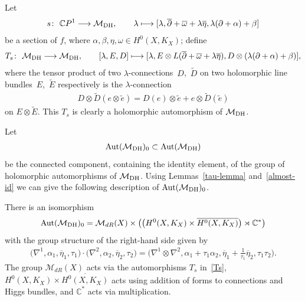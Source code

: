 Let \begin{gather*}s \colon \ {\mathbb C}P^1 \longrightarrow {\mathcal M}_{\rm DH} ,\qquad
\lambda \longmapsto [\lambda, \overline{\partial} +\overline{\omega}+ \lambda\overline{\eta}, \lambda(\partial+\alpha)+\beta]
\end{gather*}
be a section of $f$, where $\alpha, \beta, \eta, \omega \in H^0(X, K_X)$; def\/ine
\begin{gather}\label{Ts}
T_s \colon \ {\mathcal M}_{\rm DH} \longrightarrow {\mathcal M}_{\rm DH} ,\qquad [\lambda, E, D] \longmapsto [\lambda, E\otimes
L(\overline{\partial}+\overline{\omega}+\lambda\overline{\eta}), D\otimes(\lambda(\partial+\alpha)+\beta)] ,
\end{gather}
where the tensor product of two $\lambda$-connections~$D$,~$\widetilde{D}$ on two holomorphic line bundles~$E$,~$\widetilde E$ respectively is the
$\lambda$-connection
\begin{gather*}D\otimes\widetilde{D}(e\otimes\widetilde{e}) = D(e)\otimes \widetilde{e}+e\otimes \widetilde{D}(\widetilde {e})\end{gather*}
on $E\otimes\widetilde{E}$. This $T_s$ is clearly a holomorphic automorphism of ${\mathcal M}_{\rm DH}$.

Let
\begin{gather*}
\operatorname{Aut}({\mathcal M}_{\rm DH})_0 \subset \operatorname{Aut}({\mathcal M}_{\rm DH})
\end{gather*}
be the connected component, containing the identity element, of the group of holomorphic automorphisms of ${\mathcal M}_{\rm DH}$. Using Lemmas~\ref{tau-lemma} and~\ref{almost-id} we can give the following description of $\operatorname{Aut}({\mathcal M}_{\rm DH})_0$.

\begin{Theorem}\label{thmDHa}
There is an isomorphism
\begin{gather*}\operatorname{Aut}({\mathcal M}_{\rm DH})_0 =
\mathcal M_{dR}(X)\times \big(\big(H^0(X, K_X)\times\overline{H^0(X, K_X)}\big)\rtimes {\mathbb C}^*\big)\end{gather*}
with the group structure of the right-hand side given by
\begin{gather}\label{gs37}
\big(\nabla^1, \alpha_1, \overline{\eta}_1, \tau_1\big)\cdot \big(\nabla^2, \alpha_2,\overline{\eta}_2, \tau_2\big) = \big(\nabla^1\otimes\nabla^2, \alpha_1+\tau_1\alpha_2, \overline{\eta}_1+\tfrac{1}{\tau_1}\overline{\eta}_2, \tau_1\tau_2\big) .
\end{gather}
The group $\mathcal M_{dR}(X)$ acts via the automorphisms $T_s$ in~\eqref{Ts}, $H^0(X, K_X)\times\overline{H^0(X, K_X)}$ acts using addition of forms to connections and Higgs bundles, and ${\mathbb C}^*$ acts via multiplication.
\end{Theorem}


